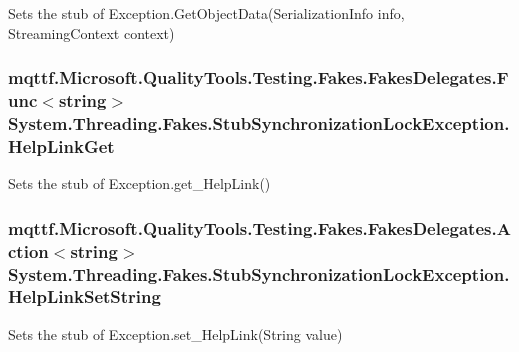 Sets the stub of Exception.\-Get\-Object\-Data(\-Serialization\-Info info, Streaming\-Context context)

\hypertarget{class_system_1_1_threading_1_1_fakes_1_1_stub_synchronization_lock_exception_ad76d5641f7ce297c098cc7ecd58036a9}{
\subsubsection[{Help\-Link\-Get}]{\setlength{\rightskip}{0pt plus 5cm}mqttf.\-Microsoft.\-Quality\-Tools.\-Testing.\-Fakes.\-Fakes\-Delegates.\-Func$<$string$>$ System.\-Threading.\-Fakes.\-Stub\-Synchronization\-Lock\-Exception.\-Help\-Link\-Get}}\label{class_system_1_1_threading_1_1_fakes_1_1_stub_synchronization_lock_exception_ad76d5641f7ce297c098cc7ecd58036a9}


Sets the stub of Exception.\-get\-\_\-\-Help\-Link()

\hypertarget{class_system_1_1_threading_1_1_fakes_1_1_stub_synchronization_lock_exception_ae07c36960782a36b46ff8a306e5b4489}{
\subsubsection[{Help\-Link\-Set\-String}]{\setlength{\rightskip}{0pt plus 5cm}mqttf.\-Microsoft.\-Quality\-Tools.\-Testing.\-Fakes.\-Fakes\-Delegates.\-Action$<$string$>$ System.\-Threading.\-Fakes.\-Stub\-Synchronization\-Lock\-Exception.\-Help\-Link\-Set\-String}}\label{class_system_1_1_threading_1_1_fakes_1_1_stub_synchronization_lock_exception_ae07c36960782a36b46ff8a306e5b4489}


Sets the stub of Exception.\-set\-\_\-\-Help\-Link(\-String value)

